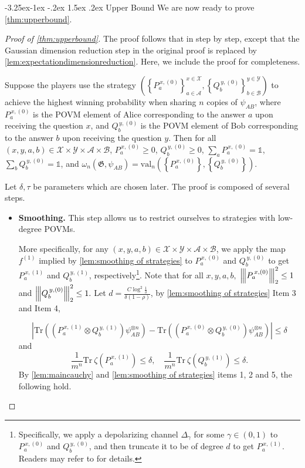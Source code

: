 \documentclass[11pt]{article}
\makeatletter
\renewcommand{\subsection}{\@startsection{subsection}{2}{\z@}%
             {-3.25ex\@plus -1ex \@minus -.2ex}%
             {1.5ex \@plus .2ex}%
             {\normalfont\large\scshape\bfseries}}
\theoremstyle{plain}
\theoremstyle{definition}
\newcommand {\set} [1] {\ensuremath{ \left\lbrace #1 \right\rbrace }}
\newcommand {\br} [1] {\ensuremath{ \left( #1 \right) }}
\newcommand {\ab} [1] {\ensuremath{ \left| #1 \right| }}
\newcommand{\nnorm}[1]{{\left\vert\kern-0.25ex\left\vert\kern-0.25ex\left\vert #1
		\right\vert\kern-0.25ex\right\vert\kern-0.25ex\right\vert}}
\newcommand {\Tr} {\ensuremath{ \mathrm{Tr} }}
\newcommand {\id} {\ensuremath{\mathds{1}}}
\newcommand{\gval}[3]{\ensuremath{\mathrm{val}_{#1}\br{\set{#2},\set{#3}}}}
\newcommand{\fourtuples}{\ensuremath{\br{x,y,a,b}\in\calX\times\calY\times\calA\times\calB}}
\newcommand{\Pnn}[1] {\ensuremath{{P^{\,x, (#1)}_a}}}
\newcommand{\Qnn}[1] {\ensuremath{{Q^{\,y, (#1)}_b}}}
\newcommand{\calX}{\mathcal{X}}
\newcommand{\calY}{\mathcal{Y}}
\newcommand{\calA}{\mathcal{A}}
\newcommand{\calB}{\mathcal{B}}
\newcommand{\1}{\mathbb{1}} %
\makeatother
\begin{document}
\subsection{Upper Bound}
We are now ready to prove \cref{thm:upperbound}.
\begin{proof}[Proof of \cref{thm:upperbound}]
The proof follows that in \cite{qin2021nonlocal} step by step, except that the Gaussian dimension reduction step in the original proof is replaced by \cref{lem:expectationdimensionreduction}. 
Here, we include the proof for completeness.

Suppose the players use the strategy $\br{\set{\Pnn{0}}^{x\in\calX}_{a\in\calA},\set{\Qnn{0}}^{y\in\calY}_{b\in\calB}}$ to achieve the highest winning probability when sharing $n$ copies of $\psi_{AB}$, where $\Pnn{0}$ is the POVM element of Alice corresponding to the answer $a$ upon receiving the question $x$, and $\Qnn{0}$ is the POVM element of Bob corresponding to the answer $b$ upon receiving the question $y$. Then for all $\br{x,y,a,b}\in\calX\times\calY\times\calA\times\calB$, $\Pnn{0}\geq0$, $\Qnn{0}\geq0$, $\sum_a\Pnn{0}=\id$, $\sum_b\Qnn{0}=\id$, and $\omega_n(\mathfrak{G},\psi_{AB})=\gval{n}{\Pnn{0}}{\Qnn{0}}$.

Let $\delta,\tau$ be parameters which are chosen later. The proof is composed of several steps.

\begin{itemize}
\item \textbf{Smoothing.} This step allows us to restrict ourselves to strategies with low-degree POVMs.

 More specifically, for any \fourtuples, we apply the map $f^{(1)}$ implied by \cref{lem:smoothing of strategies} to $\Pnn{0}$ and $\Qnn{0}$ to get $\Pnn{1}$ and $\Qnn{1}$, respectively\footnote{Specifically, we apply a depolarizing channel $\Delta_\gamma$ for some $\gamma\in(0,1)$ to $\Pnn{0}$ and $\Qnn{0}$, and then truncate it to be of degree $d$ to get $\Pnn{1}$. Readers may refer to \cite{qin2021nonlocal} for details.}. Note that for all $x,y,a,b,$ $\nnorm{\Pnn{0}}_2^2\leq1$ and $\nnorm{\Qnn{0}}_2^2\leq1.$ Let $d=\frac{C\log^2\frac{1}{\delta}}{\delta(1-\rho)}$, by \cref{lem:smoothing of strategies} Item 3 and Item 4, 

			\[\ab{\Tr\br{\br{\Pnn{1}\otimes \Qnn{1}}\psi^{\otimes n}_{AB}}-\Tr\br{\br{\Pnn{0}\otimes \Qnn{0}}\psi^{\otimes n}_{AB}}}\leq\delta\]
			and
		\[\frac{1}{m^n}\Tr~\zeta(\Pnn{1})\leq\delta,\quad\frac{1}{m^n}\Tr~\zeta(\Qnn{1})\leq\delta.\]
     By \cref{lem:maincauchy} and \cref{lem:smoothing of strategies} items 1, 2 and 5, the following hold.
     

\end{itemize}
\end{proof}
\end{document}
